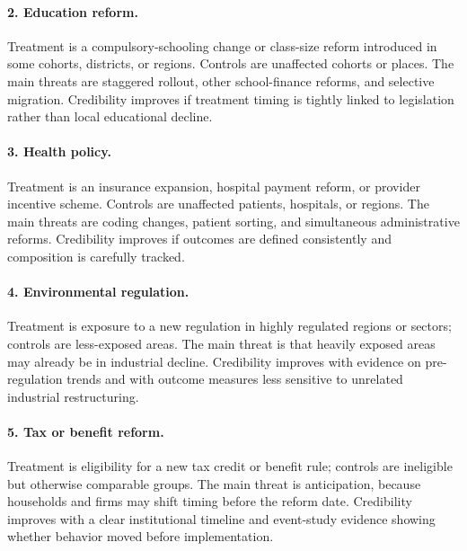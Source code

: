 \paragraph{2. Education reform.}
Treatment is a compulsory-schooling change or class-size reform introduced in some cohorts, districts, or regions. Controls are unaffected cohorts or places. The main threats are staggered rollout, other school-finance reforms, and selective migration. Credibility improves if treatment timing is tightly linked to legislation rather than local educational decline.

\paragraph{3. Health policy.}
Treatment is an insurance expansion, hospital payment reform, or provider incentive scheme. Controls are unaffected patients, hospitals, or regions. The main threats are coding changes, patient sorting, and simultaneous administrative reforms. Credibility improves if outcomes are defined consistently and composition is carefully tracked.

\paragraph{4. Environmental regulation.}
Treatment is exposure to a new regulation in highly regulated regions or sectors; controls are less-exposed areas. The main threat is that heavily exposed areas may already be in industrial decline. Credibility improves with evidence on pre-regulation trends and with outcome measures less sensitive to unrelated industrial restructuring.

\paragraph{5. Tax or benefit reform.}
Treatment is eligibility for a new tax credit or benefit rule; controls are ineligible but otherwise comparable groups. The main threat is anticipation, because households and firms may shift timing before the reform date. Credibility improves with a clear institutional timeline and event-study evidence showing whether behavior moved before implementation.

